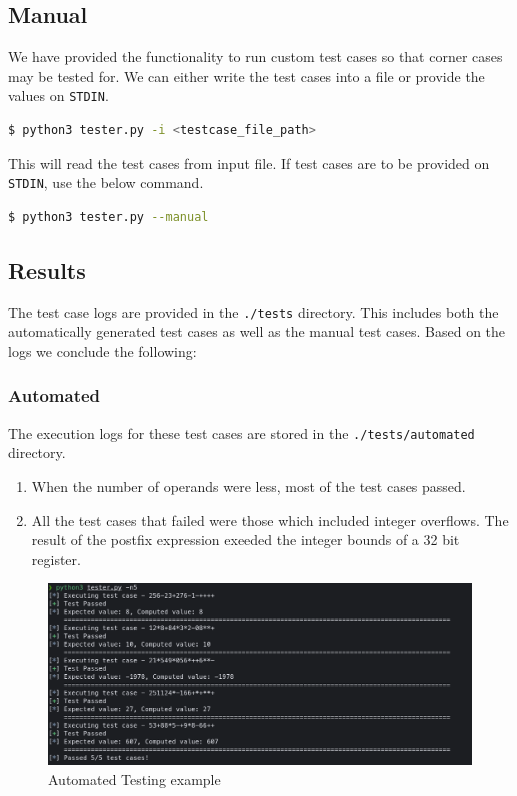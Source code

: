 \documentclass[hidelinks,12pt]{article}
\begin{document}
\subsection{Manual}
We have provided the functionality to run custom test cases so that corner cases may be tested for. We can either write the test cases into a file or provide the values on \verb|STDIN|.
\begin{lstlisting}[language=bash]
    $ python3 tester.py -i <testcase_file_path>
\end{lstlisting}
This will read the test cases from input file. If test cases are to be provided on \verb|STDIN|, use the below command.
\begin{lstlisting}[language=bash]
    $ python3 tester.py --manual
\end{lstlisting}
\subsection{Results}
The test case logs are provided in the \verb|./tests| directory. This includes both the automatically generated test cases as well as the manual test cases. Based on the logs we conclude the following:
\subsubsection{Automated}
The execution logs for these test cases are stored in the \verb|./tests/automated| directory.
\begin{enumerate}
    \item When the number of operands were less, most of the test cases passed.
    \item All the test cases that failed were those which included integer overflows. The result of the postfix expression exeeded the integer bounds of a 32 bit register.
\end{enumerate}

\begin{figure}[h!]
    \includegraphics[width=\linewidth]{logs.png}
    \caption{Automated Testing example}
    \label{fig:boat1}
\end{figure}
\end{document}
